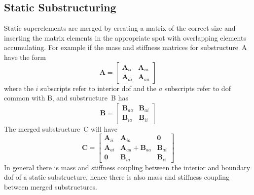 \documentclass[10pt,openany,twoside]{book}
\numberwithin{equation}{section}   %
\newcommand{\Matrix}[1]{\boldsymbol{#1}}
\newcommand{\Ss}{substructure}
\newcommand{\Sss}{substructures}
\begin{document}
\subsection{\label{sect:static-ss}Static Substructuring}
\par
Static superelements are merged by creating a matrix of the correct size
and inserting the matrix elements in the appropriate spot with
overlapping elements accumulating.
For example if the mass and stiffness matrices for \Ss\ A have the form
\begin{equation}
\Matrix{A} = \left[
\begin{array}{cc}
   \Matrix{A}_{ii} & \Matrix{A}_{ia} \\
   \Matrix{A}_{ai} & \Matrix{A}_{aa}
\end{array}
\right]	\nonumber
\end{equation}
where the $i$ subscripts refer to interior dof and the $a$
subscripts refer to dof common with B, and \Ss\ B has
\begin{equation}
\Matrix{B} = \left[
\begin{array}{cc}
   \Matrix{B}_{aa} & \Matrix{B}_{ai} \\
   \Matrix{B}_{ia} & \Matrix{B}_{ii}
\end{array}
\right]	\nonumber
\end{equation}
The merged \Ss\ C will have
\begin{displaymath}
\Matrix{C} = \left[
\begin{array}{ccc}
   \Matrix{A}_{ii} & \Matrix{A}_{ia} & \Matrix{0} \\
   \Matrix{A}_{ai} & \Matrix{A}_{aa} + \Matrix{B}_{aa} & \Matrix{B}_{ai} \\
   \Matrix{0} & \Matrix{B}_{ia} & \Matrix{B}_{ii}
\end{array}
\right]
\end{displaymath}
In general there is mass and stiffness coupling between the
interior and boundary dof of a static \Ss, hence
there is also mass and stiffness coupling between
merged \Sss.
\end{document}
